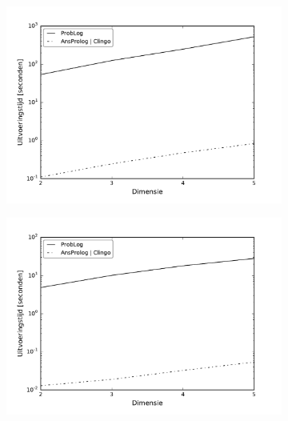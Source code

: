 \documentclass{article}
\begin{document}
\begin{figure}[t]
\centering
\begin{subfigure}{.33\textwidth}
  \centering
  \includegraphics[width=\linewidth]{Grafieken/Tijd/chm_100_log.pdf}
  \caption{}
  \label{fig:sub1}
\end{subfigure}%
\begin{subfigure}{.33\textwidth}
  \centering
  \includegraphics[width=\linewidth]{Grafieken/Tijd/dungeons_100_log.pdf}
  \caption{}
  \label{fig:sub2}
\end{subfigure}
\begin{subfigure}{.33\textwidth}
  \centering

\end{subfigure}
\end{figure}
\end{document}
